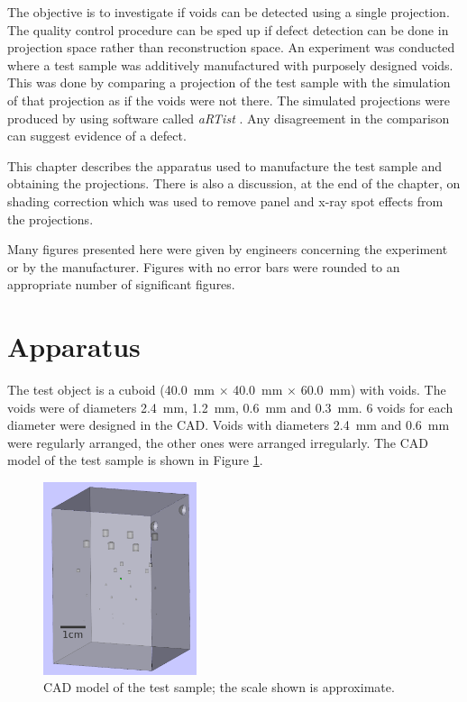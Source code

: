 The objective is to investigate if voids can be detected using a single projection. The quality control procedure can be sped up if defect detection can be done in projection space rather than reconstruction space. An experiment was conducted where a test sample was additively manufactured with purposely designed voids. This was done by comparing a projection of the test sample with the simulation of that projection as if the voids were not there. The simulated projections were produced by using software called \emph{aRTist} \citep{bellon2007artist, jaenisch2008artist, bellon2012radiographic}. Any disagreement in the comparison can suggest evidence of a defect.

This chapter describes the apparatus used to manufacture the test sample and obtaining the projections. There is also a discussion, at the end of the chapter, on shading correction which was used to remove panel and x-ray spot effects from the projections.

Many figures presented here were given by engineers concerning the experiment or by the manufacturer. Figures with no error bars were rounded to an appropriate number of significant figures.

\section{Apparatus}

The test object is a cuboid (\SI{40.0}{\milli\metre} $\times$ \SI{40.0}{\milli\metre} $\times$ \SI{60.0}{\milli\metre}) with voids. The voids were of diameters \SI{2.4}{\milli\metre}, \SI{1.2}{\milli\metre}, \SI{0.6}{\milli\metre} and \SI{0.3}{\milli\metre}. 6 voids for each diameter were designed in the CAD. Voids with diameters \SI{2.4}{\milli\metre} and \SI{0.6}{\milli\metre} were regularly arranged, the other ones were arranged irregularly. The CAD model of the test sample is shown in Figure \ref{fig:inference_testObject}.

\begin{figure}
  \centering
  \includegraphics[width=0.4\textwidth]{../figures/inference/TestObject.png}
  \caption{CAD model of the test sample; the scale shown is approximate.}
  \label{fig:inference_testObject}
\end{figure}

